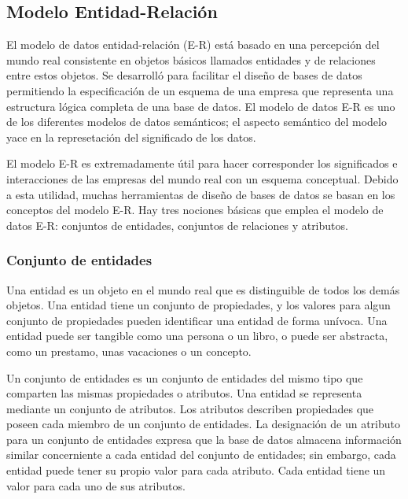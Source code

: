 \subsection{Modelo Entidad-Relación}
	\par 
		El modelo de datos entidad-relación (E-R) está basado en una percepción del mundo real consistente en objetos básicos llamados entidades y de relaciones entre estos objetos. Se desarrolló para facilitar el diseño de bases de datos permitiendo la especificación de un esquema de una empresa que representa una estructura lógica completa de una base de datos. El modelo de datos E-R es uno de los diferentes modelos de datos semánticos; el aspecto semántico del modelo yace en la represetación del significado de los datos. 
		
\clearpage
\thispagestyle{plain}

	\par \noindent
		El modelo E-R es extremadamente útil para hacer corresponder los significados e interacciones de las empresas del mundo real con un esquema conceptual.
		Debido a esta utilidad, muchas herramientas de diseño de bases de datos se basan en los conceptos del modelo E-R. Hay tres nociones básicas que emplea el modelo de datos E-R: conjuntos de entidades, conjuntos de relaciones y atributos.
		
	\subsubsection{Conjunto de entidades}
		\par \noindent
			Una entidad es un objeto en el mundo real que es distinguible de todos los demás objetos. Una entidad tiene un conjunto de propiedades, y los valores para algun conjunto de propiedades pueden identificar una entidad de forma unívoca. Una entidad puede ser tangible como una persona o un libro, o puede ser abstracta, como un prestamo, unas vacaciones o un concepto.
			
		\par \noindent
			Un conjunto de entidades es un conjunto de entidades del mismo tipo que comparten las mismas propiedades o atributos. Una entidad se representa mediante un conjunto de atributos. Los atributos describen propiedades que poseen cada miembro de un conjunto de entidades. La designación de un atributo para un conjunto de entidades expresa que la base de datos almacena información similar concerniente a cada entidad del conjunto de entidades; sin embargo, cada entidad puede tener su propio valor para cada atributo. Cada entidad tiene un valor para cada uno de sus atributos.
			

